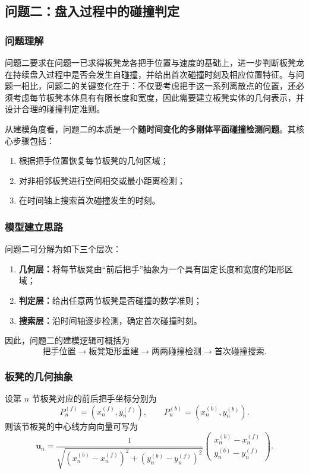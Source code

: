\documentclass[12pt,a4paper]{ctexart}
\begin{document}
\subsection{问题二：盘入过程中的碰撞判定}

\subsubsection{问题理解}
问题二要求在问题一已求得板凳龙各把手位置与速度的基础上，进一步判断板凳龙在持续盘入过程中是否会发生自碰撞，并给出首次碰撞时刻及相应位置特征。与问题一相比，问题二的关键变化在于：不仅要考虑把手这一系列离散点的位置，还必须考虑每节板凳本体具有有限长度和宽度，因此需要建立板凳实体的几何表示，并设计合理的碰撞判定准则。

从建模角度看，问题二的本质是一个\textbf{随时间变化的多刚体平面碰撞检测问题}。其核心步骤包括：
\begin{enumerate}
    \item 根据把手位置恢复每节板凳的几何区域；
    \item 对非相邻板凳进行空间相交或最小距离检测；
    \item 在时间轴上搜索首次碰撞发生的时刻。
\end{enumerate}

\subsubsection{模型建立思路}
问题二可分解为如下三个层次：

\begin{enumerate}
    \item \textbf{几何层：}将每节板凳由“前后把手”抽象为一个具有固定长度和宽度的矩形区域；
    \item \textbf{判定层：}给出任意两节板凳是否碰撞的数学准则；
    \item \textbf{搜索层：}沿时间轴逐步检测，确定首次碰撞时刻。
\end{enumerate}

因此，问题二的建模逻辑可概括为
\[
\text{把手位置} \longrightarrow \text{板凳矩形重建} \longrightarrow \text{两两碰撞检测} \longrightarrow \text{首次碰撞搜索}.
\]

\subsubsection{板凳的几何抽象}
设第 $n$ 节板凳对应的前后把手坐标分别为
\[
P_n^{(f)}=(x_n^{(f)},y_n^{(f)}), \qquad
P_n^{(b)}=(x_n^{(b)},y_n^{(b)}).
\]
则该节板凳的中心线方向向量可写为
\begin{equation}
\bm{u}_n=
\frac{1}{\sqrt{\left(x_n^{(b)}-x_n^{(f)}\right)^2+\left(y_n^{(b)}-y_n^{(f)}\right)^2}}
\begin{pmatrix}
x_n^{(b)}-x_n^{(f)}\\
y_n^{(b)}-y_n^{(f)}
\end{pmatrix}.
\end{equation}
\end{document}
